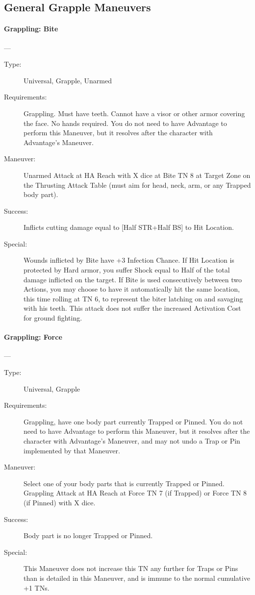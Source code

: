 \documentclass[oneside,11pt,english]{book}
\begin{document}
\subsection{General Grapple Maneuvers}
\paragraph{\large\label{man:Grappling: Bite}Grappling: Bite}---\quad{\large[X+1]}
\vspace{-10pt}\begin{description} 
\item [Type:] Universal, Grapple, Unarmed 
\item [Requirements:] Grappling. Must have teeth. Cannot have a visor or other armor covering the face. No 
hands required. You do not need to have Advantage to perform this Maneuver, but it resolves after the 
character with Advantage's Maneuver. 
\item [Maneuver:] Unarmed Attack at HA Reach with X dice at Bite TN 8 at Target Zone on the Thrusting 
Attack Table (must aim for head, neck, arm, or any Trapped body part). 
\item [Success:] Inflicts cutting damage equal to [Half STR+Half BS] to Hit Location. 
\item [Special:] Wounds inflicted by Bite have +3 Infection Chance. If Hit Location is protected by Hard armor, 
you suffer Shock equal to Half of the total damage inflicted on the target. 
If Bite is used consecutively between two Actions, you may choose to have it automatically hit the same 
location, this time rolling at TN 6, to represent the biter latching on and savaging with his teeth. 
This attack does not suffer the increased Activation Cost for ground fighting. 
\end{description}

\paragraph{\large\label{man:Grappling: Force}Grappling: Force}---\quad{\large[X+1]}
\vspace{-10pt}\begin{description} 
\item [Type:] Universal, Grapple 
\item [Requirements:] Grappling, have one body part currently Trapped or Pinned. You do not need to have 
Advantage to perform this Maneuver, but it resolves after the character with Advantage's Maneuver, and 
may not undo a Trap or Pin implemented by that Maneuver. 
\item [Maneuver:] Select one of your body parts that is currently Trapped or Pinned. Grappling Attack at HA 
Reach at Force TN 7 (if Trapped) or Force TN 8 (if Pinned) with X dice. 
\item [Success:] Body part is no longer Trapped or Pinned. 
\item [Special:] This Maneuver does not increase this TN any further for Traps or Pins than is detailed in this 
Maneuver, and is immune to the normal cumulative +1 TNs. 
\end{description}
\end{document}
